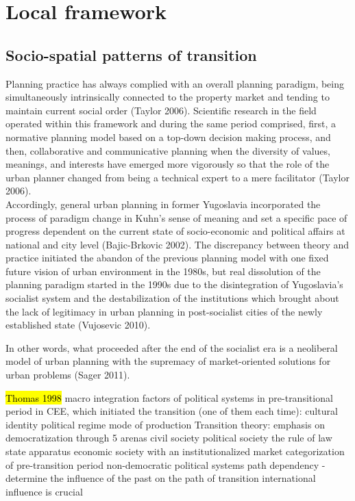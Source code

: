 \documentclass[11pt]{report}
\begin{document}
\section{Local framework}

\subsection{Socio-spatial patterns of transition}
Planning practice has always complied with an overall planning paradigm, being simultaneously intrinsically connected to the property market and tending to maintain current social order (Taylor 2006). Scientific research in the field operated within this framework and during the same period comprised, first, a normative planning model based on a top-down decision making process, and then, collaborative and communicative planning when the diversity of values, meanings, and interests have emerged more vigorously so that the role of the urban planner changed from being a technical expert to a mere facilitator (Taylor 2006).
\\
Accordingly, general urban planning in former Yugoslavia incorporated the process of paradigm change in Kuhn’s sense of meaning and set a specific pace of progress dependent on the current state of socio-economic and political affairs at national and city level (Bajic-Brkovic 2002). The discrepancy between theory and practice initiated the abandon of the previous planning model with one fixed future vision of urban environment in the 1980s, but real dissolution of the planning paradigm started in the 1990s due to the disintegration of Yugoslavia’s socialist system and the destabilization of the institutions which brought about the lack of legitimacy in urban planning in post-socialist cities of the newly established state (Vujosevic 2010).

In other words, what proceeded after the end of the socialist era is a neoliberal model of urban planning with the supremacy of market-oriented solutions for urban problems (Sager 2011).

\hl{Thomas 1998}
macro integration factors of political systems in pre-transitional period in CEE, which initiated the transition (one of them each time):
    cultural identity
    political regime
    mode of production
Transition theory:
    emphasis on democratization through 5 arenas
        civil society
        political society
        the rule of law
        state apparatus
        economic society with an institutionalized market
    categorization of pre-transition period
        non-democratic political systems
    path dependency - determine the influence of the past on the path of transition
    international influence is crucial
\end{document}
